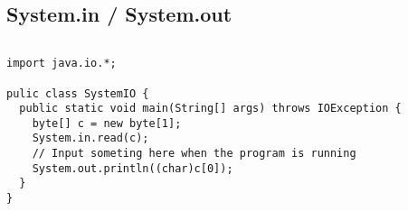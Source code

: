 \documentclass[en, 11pt, xcolor=dvipsnames]{beamer}
\begin{document}
\subsection{System.in / System.out}
\begin{frame}[fragile]


	\begin{columns}[c]
		\begin{column}{0.9\textwidth}

			\begin{lstlisting}[style=Java]
import java.io.*;

pulic class SystemIO {
  public static void main(String[] args) throws IOException {
    byte[] c = new byte[1];
    System.in.read(c);
    // Input someting here when the program is running
    System.out.println((char)c[0]);
  }
}\end{lstlisting}

		\end{column}
	\end{columns}

\end{frame}
\end{document}
